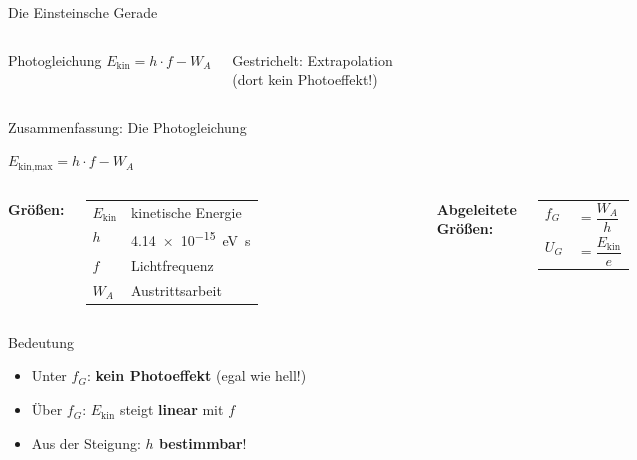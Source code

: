 \documentclass[aspectratio=169,11pt]{beamer}
\begin{document}
\begin{frame}{Die Einsteinsche Gerade}
\begin{columns}
\vspace{0.8em}

\begin{block}{Photogleichung}
\centering
$E_{\text{kin}} = h \cdot f - W_A$
\end{block}

\vspace{0.3em}
{\small Gestrichelt: Extrapolation\\(dort kein Photoeffekt!)}

\end{columns}

\end{frame}

\begin{frame}{Zusammenfassung: Die Photogleichung}

\begin{center}
\Large
$\boxed{E_{\text{kin,max}} = h \cdot f - W_A}$
\end{center}

\vspace{1em}

\begin{columns}
\textbf{Größen:}
\begin{tabular}{ll}
$E_{\text{kin}}$ & kinetische Energie \\
$h$ & \SI{4,14e-15}{eV.s} \\
$f$ & Lichtfrequenz \\
$W_A$ & Austrittsarbeit \\
\end{tabular}

\textbf{Abgeleitete Größen:}
\begin{tabular}{ll}
$f_G$ & $= \dfrac{W_A}{h}$ \\[0.8em]
$U_G$ & $= \dfrac{E_{\text{kin}}}{e}$ \\
\end{tabular}
\end{columns}

\vspace{1em}

\begin{block}{Bedeutung}
\begin{itemize}
    \item Unter $f_G$: \textbf{kein Photoeffekt} (egal wie hell!)
    \item Über $f_G$: $E_{\text{kin}}$ steigt \textbf{linear} mit $f$
    \item Aus der Steigung: \textbf{$h$ bestimmbar}!
\end{itemize}
\end{block}

\end{frame}
\end{document}
